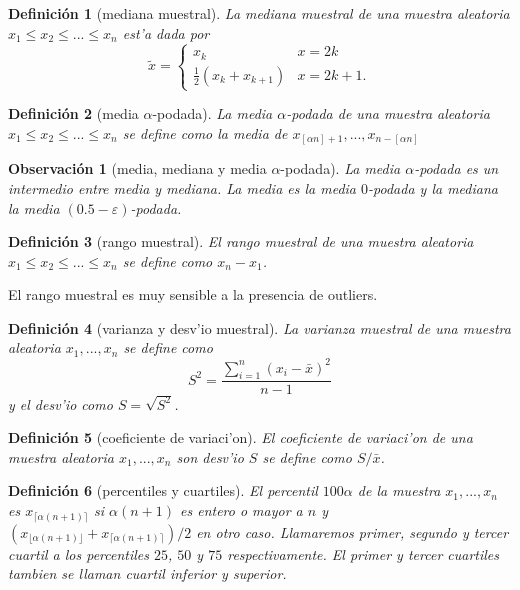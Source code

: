 \documentclass[a4paper,spanish]{article}
\newcommand{\eps}[0]{\varepsilon}
\newtheorem{defi}{Definici\'on}
\newtheorem{obs}{Observaci\'on}
\begin{document}
\begin{defi}[mediana muestral]
La \emph{mediana muestral} de una muestra aleatoria $x_1 \leq x_2 \leq ...
\leq x_n$ est'a dada por
$$\tilde{x} = 
	\begin{cases}
	x_k & x = 2k \\
	\frac{1}{2}(x_k+x_{k+1}) & x = 2k+1.
	\end{cases}$$
\end{defi}

\begin{defi}[media $\alpha$-podada]
La \emph{media $\alpha$-podada} de una muestra aleatoria $x_1 \leq x_2 \leq ...
\leq x_n$ se define como la media de $x_{[\alpha n] + 1},...,x_{n-[\alpha n]}$
\end{defi}

\begin{obs}[media, mediana y media $\alpha$-podada]
La media $\alpha$-podada es un intermedio entre media y mediana. La media es
la media $0$-podada y la mediana la media $(0.5-\eps)$-podada.
\end{obs}

\begin{defi}[rango muestral]
El \emph{rango muestral} de una muestra aleatoria $x_1 \leq x_2 \leq ...
\leq x_n$ se define como $x_n - x_1$.
\end{defi}
El rango muestral es muy sensible a la presencia de outliers.


\begin{defi}[varianza y desv'io muestral]
La \emph{varianza muestral} de una muestra aleatoria $x_1,...,x_n$ se define
como 
$$S^2 = \frac{\sum_{i=1}^n (x_i-\bar{x})^2}{n-1}$$
y el desv'io como $S = \sqrt{S^2}$.
\end{defi}

\begin{defi}[coeficiente de variaci'on]
El \emph{coeficiente de variaci'on} de una muestra aleatoria $x_1,...,x_n$
son desv'io $S$ se define como $S / \bar{x}$.
\end{defi}

\begin{defi}[percentiles y cuartiles]
El \emph{percentil} $100 \alpha$ de la muestra $x_1,...,x_n$ es 
$x_{\lceil\alpha (n+1)\rceil}$ si $\alpha (n+1)$ es entero o mayor a $n$ y 
$(x_{\lfloor\alpha (n+1)\rfloor}+x_{\lceil\alpha (n+1)\rceil})/2$ en otro caso.
Llamaremos primer, segundo y tercer \emph{cuartil} a los percentiles $25$, 
$50$ y $75$ respectivamente. El primer y tercer cuartiles tambien se llaman
cuartil inferior y superior.
\end{defi}
\end{document}
